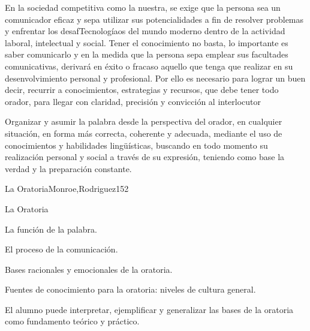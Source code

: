 \begin{syllabus}


\begin{justification}
En la sociedad competitiva como la nuestra,  se exige que la persona sea un comunicador eficaz y  sepa utilizar sus potencialidades a fin de resolver problemas y enfrentar los desafTecnologíaos del mundo moderno dentro de la actividad laboral, intelectual y social. Tener el conocimiento no basta, lo importante es saber comunicarlo y en la medida que la persona sepa emplear sus facultades comunicativas, derivará en éxito o fracaso aquello que tenga que realizar en su desenvolvimiento personal y profesional. Por ello es necesario para lograr un buen decir, recurrir a conocimientos, estrategias y recursos, que debe tener todo orador, para llegar con claridad, precisión y convicción al interlocutor
\end{justification}

\begin{goals}
\item Organizar y asumir la palabra desde la perspectiva del orador, en cualquier situación, en forma más correcta, coherente  y adecuada, mediante el uso de conocimientos y habilidades lingüísticas, buscando en todo momento su realización personal y social  a través de su expresión, teniendo como base  la verdad y la preparación constante.  
\end{goals}

\begin{outcomes}
\end{outcomes}

\begin{unit}{La Oratoria}{Monroe,Rodriguez}{15}{2}
\begin{topics}
	\item La Oratoria
	\item La función de la palabra.
	\item El proceso de la comunicación.
	\item Bases racionales y emocionales de la oratoria.
	\item Fuentes de conocimiento para la oratoria: niveles de cultura general.
\end{topics}
\begin{unitgoals}
	\item El alumno puede interpretar, ejemplificar y generalizar las bases de la oratoria como fundamento teórico  y  práctico.
\end{unitgoals}
\end{unit}


\end{syllabus}
